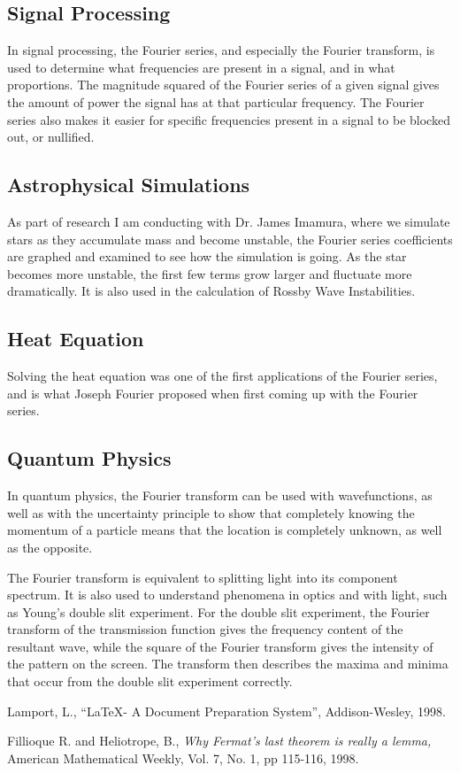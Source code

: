 \documentclass{article}
\begin{document}
\subsection{Signal Processing}
In signal processing, the Fourier series, and especially the Fourier transform, is used to determine what frequencies are present in a signal, and in what proportions. The magnitude squared of the Fourier series of a given signal gives the amount of power the signal has at that particular frequency. The Fourier series also makes it easier for specific frequencies present in a signal to be blocked out, or nullified.
\subsection{Astrophysical Simulations}
As part of research I am conducting with Dr. James Imamura, where we simulate stars as they accumulate mass and become unstable, the Fourier series coefficients are graphed and examined to see how the simulation is going. As the star becomes more unstable, the first few terms grow larger and fluctuate more dramatically.
It is also used in the calculation of Rossby Wave Instabilities.
\subsection{Heat Equation}
Solving the heat equation was one of the first applications of the Fourier series, and is what Joseph Fourier proposed when first coming up with the Fourier series.

\subsection{Quantum Physics}
In quantum physics, the Fourier transform can be used with wavefunctions, as well as with the uncertainty principle to show that completely knowing the momentum of a particle means that the location is completely unknown, as well as the opposite. 

The Fourier transform is equivalent to splitting light into its component spectrum. It is also used to understand phenomena in optics and with light, such as Young's double slit experiment. For the double slit experiment, the Fourier transform of the transmission function gives the frequency content of the resultant wave, while the square of the Fourier transform gives the intensity of the pattern on the screen. The transform then describes the maxima and minima that occur from the double slit experiment correctly.

\begin{thebibliography}{9}
         {\sc Lamport, L.,}
         ``\LaTeX - A Document Preparation System'',
         Addison-Wesley, 1998.

         {\sc Fillioque R.} and {\sc Heliotrope, B.,}
         {\em Why Fermat's last theorem is really a lemma,}
         American Mathematical Weekly,
         Vol. 7, No. 1, pp 115-116, 1998.

\end{thebibliography}
\end{document}

